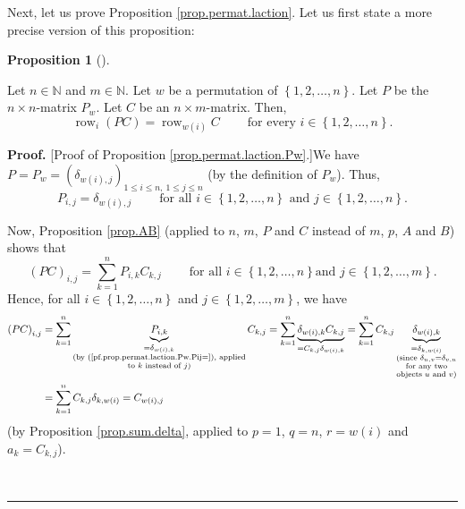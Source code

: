 \documentclass[numbers=enddot,12pt,final,onecolumn,notitlepage]{scrartcl}%
\theoremstyle{definition}
\newtheorem{prop}[theo]{Proposition}
\newenvironment{proposition}[1][]
{\begin{prop}[#1]\begin{leftbar}}
{\end{leftbar}\end{prop}}
\newenvironment{proof}[1][Proof]{\noindent\textbf{#1.} }{\ \rule{0.5em}{0.5em}}
\let\sumnonlimits\sum
\renewcommand{\sum}{\sumnonlimits\limits}
\begin{document}
Next, let us prove Proposition \ref{prop.permat.laction}. Let us first state a
more precise version of this proposition:

\begin{proposition}
\label{prop.permat.laction.Pw}Let $n\in\mathbb{N}$ and $m\in\mathbb{N}$. Let
$w$ be a permutation of $\left\{  1,2,\ldots,n\right\}  $. Let $P$ be the
$n\times n$-matrix $P_{w}$. Let $C$ be an $n\times m$-matrix. Then,%
\[
\operatorname*{row}\nolimits_{i}\left(  PC\right)  =\operatorname*{row}%
\nolimits_{w\left(  i\right)  }C\ \ \ \ \ \ \ \ \ \ \text{for every }%
i\in\left\{  1,2,\ldots,n\right\}  .
\]

\end{proposition}

\begin{proof}
[Proof of Proposition \ref{prop.permat.laction.Pw}.]We have $P=P_{w}=\left(
\delta_{w\left(  i\right)  ,j}\right)  _{1\leq i\leq n,\ 1\leq j\leq n}$ (by
the definition of $P_{w}$). Thus,%
\begin{equation}
P_{i,j}=\delta_{w\left(  i\right)  ,j}\ \ \ \ \ \ \ \ \ \ \text{for all }%
i\in\left\{  1,2,\ldots,n\right\}  \text{ and }j\in\left\{  1,2,\ldots
,n\right\}  . \label{pf.prop.permat.laction.Pw.Pij=}%
\end{equation}


Now, Proposition \ref{prop.AB} (applied to $n$, $m$, $P$ and $C$ instead of
$m$, $p$, $A$ and $B$) shows that%
\[
\left(  PC\right)  _{i,j}=\sum_{k=1}^{n}P_{i,k}C_{k,j}%
\ \ \ \ \ \ \ \ \ \ \text{for all }i\in\left\{  1,2,\ldots,n\right\}  \text{
and }j\in\left\{  1,2,\ldots,m\right\}  .
\]
Hence, for all $i\in\left\{  1,2,\ldots,n\right\}  $ and $j\in\left\{
1,2,\ldots,m\right\}  $, we have%
\begin{align}
\left(  PC\right)  _{i,j}  &  =\sum_{k=1}^{n}\underbrace{P_{i,k}%
}_{\substack{=\delta_{w\left(  i\right)  ,k}\\\text{(by
(\ref{pf.prop.permat.laction.Pw.Pij=}), applied}\\\text{to }k\text{ instead of
}j\text{)}}}C_{k,j}=\sum_{k=1}^{n}\underbrace{\delta_{w\left(  i\right)
,k}C_{k,j}}_{=C_{k,j}\delta_{w\left(  i\right)  ,k}}=\sum_{k=1}^{n}%
C_{k,j}\underbrace{\delta_{w\left(  i\right)  ,k}}_{\substack{=\delta
_{k,w\left(  i\right)  }\\\text{(since }\delta_{u,v}=\delta_{v,u}\\\text{for
any two}\\\text{objects }u\text{ and }v\text{)}}}\nonumber\\
&  =\sum_{k=1}^{n}C_{k,j}\delta_{k,w\left(  i\right)  }=C_{w\left(  i\right)
,j} \label{pf.prop.permat.laction.Pw.PCij=}%
\end{align}
(by Proposition \ref{prop.sum.delta}, applied to $p=1$, $q=n$, $r=w\left(
i\right)  $ and $a_{k}=C_{k,j}$).


\end{proof}
\end{document}
